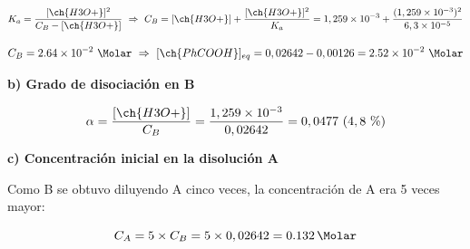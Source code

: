 \begin{exerciseEVAU}
\begin{solu}
        \begin{equation*}
            K_a = \dfrac{[\ch{H3O+}]^2}{C_B - [\ch{H3O+}]} \ \Rightarrow \ C_B = [\ch{H3O+}] + \dfrac{[\ch{H3O+}]^2}{K_a} = 1,259\times10^{-3} + \dfrac{(1,259\times10^{-3})^2}{6,3\times10^{-5}}
        \end{equation*}

        \begin{equation*}
            C_B = \num{2.64e-2} \ \si{\Molar} \ \Rightarrow \ [\ch{PhCOOH}]_{eq} = 0,02642 - 0,00126 = \num{2.52e-2} \ \si{\Molar}
        \end{equation*}

        \textbf{b) Grado de disociación en B}

        \begin{equation*}
            \alpha = \dfrac{[\ch{H3O+}]}{C_B} = \dfrac{1,259\times10^{-3}}{0,02642} = 0,0477 \ (4,8\ \%)
        \end{equation*}

        \textbf{c) Concentración inicial en la disolución A}

        Como B se obtuvo diluyendo A cinco veces, la concentración de A era 5 veces mayor:

        \begin{equation*}
            C_A = 5 \times C_B = 5 \times 0,02642 = \SI{0.132}{\Molar}
        \end{equation*}

    \end{solu}
\end{exerciseEVAU}

